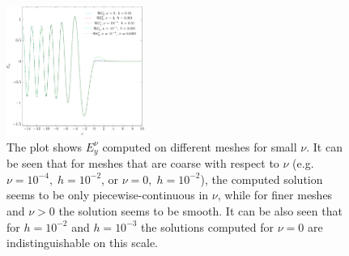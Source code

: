 \begin{figure}
 \includegraphics[width=0.4\textwidth]{figure2-crop.pdf}
 \caption{The plot shows $E_{y}^{\nu}$ computed on different meshes for small $\nu$. It can be seen that for meshes that are coarse 
 with respect to $\nu$ (e.g. $\nu=10^{-4}, \; h=10^{-2}$, or $\nu=0,\; h=10^{-2}$), the computed solution seems to be only piecewise-continuous in $\nu$, 
 while for finer meshes and $\nu>0$ the solution seems to be smooth. It can be also seen that for $h=10^{-2}$ and $h=10^{-3}$ the solutions 
 computed for $\nu=0$ are indistinguishable on this scale.}
 \label{fig:small_nu}
\end{figure}







